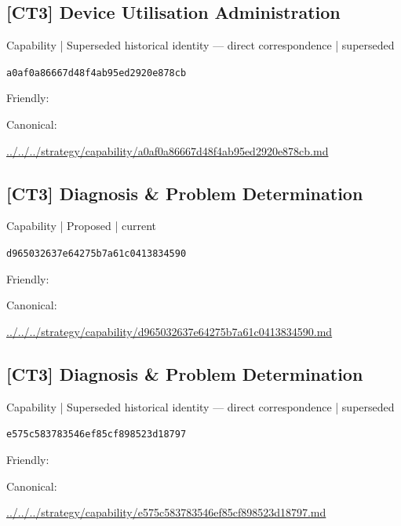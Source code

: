\documentclass[10pt,a4paper]{article}
\begin{document}
\subsection*{[CT3] Device Utilisation Administration}
{\small Capability | Superseded historical identity — direct correspondence | superseded}\par
\texttt{a0af0a86667d48f4ab95ed2920e878cb}\par
Friendly: \par
Canonical: \par
{\footnotesize\url{../../../strategy/capability/a0af0a86667d48f4ab95ed2920e878cb.md}}\par
\subsection*{[CT3] Diagnosis \& Problem Determination}
{\small Capability | Proposed | current}\par
\texttt{d965032637e64275b7a61c0413834590}\par
Friendly: \par
Canonical: \par
{\footnotesize\url{../../../strategy/capability/d965032637e64275b7a61c0413834590.md}}\par
\subsection*{[CT3] Diagnosis \& Problem Determination}
{\small Capability | Superseded historical identity — direct correspondence | superseded}\par
\texttt{e575c583783546ef85cf898523d18797}\par
Friendly: \par
Canonical: \par
{\footnotesize\url{../../../strategy/capability/e575c583783546ef85cf898523d18797.md}}\par
\end{document}
